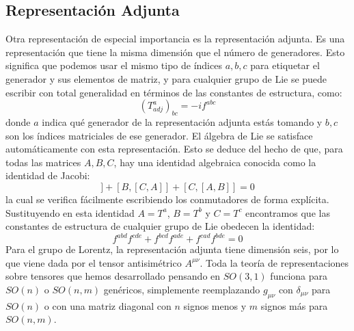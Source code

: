 \documentclass[a4paper,11pt]{book} %
\begin{document}
\subsection{Representación Adjunta}
\noindent
Otra representación de especial importancia es la representación adjunta. Es una representación que tiene la misma dimensión que el número de generadores. Esto significa que podemos usar el mismo tipo de índices $a, b, c$ para etiquetar el generador y sus elementos de matriz, y para cualquier grupo de Lie se puede escribir con total generalidad en términos de las constantes de estructura, como:
\begin{equation}
(T_{adj}^{a})_{bc}=-if^{abc}
\end{equation}
\noindent
donde $a$ indica qué generador de la representación adjunta estás tomando y $b,c$ son los índices matriciales de ese generador.
\medskip\newline
El álgebra de Lie se satisface automáticamente con esta representación. Esto se deduce del hecho de que, para todas las matrices $A, B, C$, hay una identidad algebraica conocida como la identidad de Jacobi:
\begin{equation}
[A,[B,C]]+[B,[C,A]]+[C,[A,B]]=0
\end{equation}
la cual se verifica fácilmente escribiendo los conmutadores de forma explícita. Sustituyendo en esta identidad $A=T^{a}$, $B=T^{b}$ y $C=T^{c}$ encontramos que las constantes de estructura de cualquier grupo de Lie obedecen la identidad:
\begin{equation}
f^{abd}f^{cde}+f^{bcd}f^{ade}+f^{cad}f^{bde}=0
\end{equation}
\noindent
Para el grupo de Lorentz, la representación adjunta tiene dimensión seis, por lo que viene dada por el tensor antisimétrico $A^{\mu\nu}$. Toda la teoría de representaciones sobre tensores que hemos desarrollado pensando en $SO(3,1)$ funciona para $SO(n)$ o $SO(n,m)$ genéricos, simplemente reemplazando $g_{\mu\nu}$ con $\delta_{\mu\nu}$ para $SO(n)$ o con una matriz diagonal con $n$ signos menos y $m$ signos más para $SO(n,m)$.
\end{document}
